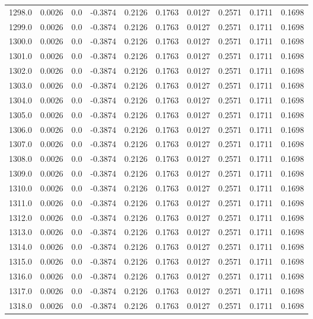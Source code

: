 \begin{longtable}{lrrrrrrrrr}
1298.0 & 0.0026 & 0.0 & -0.3874 & 0.2126 & 0.1763 & 0.0127 & 0.2571 & 0.1711 & 0.1698 \\
1299.0 & 0.0026 & 0.0 & -0.3874 & 0.2126 & 0.1763 & 0.0127 & 0.2571 & 0.1711 & 0.1698 \\
1300.0 & 0.0026 & 0.0 & -0.3874 & 0.2126 & 0.1763 & 0.0127 & 0.2571 & 0.1711 & 0.1698 \\
1301.0 & 0.0026 & 0.0 & -0.3874 & 0.2126 & 0.1763 & 0.0127 & 0.2571 & 0.1711 & 0.1698 \\
1302.0 & 0.0026 & 0.0 & -0.3874 & 0.2126 & 0.1763 & 0.0127 & 0.2571 & 0.1711 & 0.1698 \\
1303.0 & 0.0026 & 0.0 & -0.3874 & 0.2126 & 0.1763 & 0.0127 & 0.2571 & 0.1711 & 0.1698 \\
1304.0 & 0.0026 & 0.0 & -0.3874 & 0.2126 & 0.1763 & 0.0127 & 0.2571 & 0.1711 & 0.1698 \\
1305.0 & 0.0026 & 0.0 & -0.3874 & 0.2126 & 0.1763 & 0.0127 & 0.2571 & 0.1711 & 0.1698 \\
1306.0 & 0.0026 & 0.0 & -0.3874 & 0.2126 & 0.1763 & 0.0127 & 0.2571 & 0.1711 & 0.1698 \\
1307.0 & 0.0026 & 0.0 & -0.3874 & 0.2126 & 0.1763 & 0.0127 & 0.2571 & 0.1711 & 0.1698 \\
1308.0 & 0.0026 & 0.0 & -0.3874 & 0.2126 & 0.1763 & 0.0127 & 0.2571 & 0.1711 & 0.1698 \\
1309.0 & 0.0026 & 0.0 & -0.3874 & 0.2126 & 0.1763 & 0.0127 & 0.2571 & 0.1711 & 0.1698 \\
1310.0 & 0.0026 & 0.0 & -0.3874 & 0.2126 & 0.1763 & 0.0127 & 0.2571 & 0.1711 & 0.1698 \\
1311.0 & 0.0026 & 0.0 & -0.3874 & 0.2126 & 0.1763 & 0.0127 & 0.2571 & 0.1711 & 0.1698 \\
1312.0 & 0.0026 & 0.0 & -0.3874 & 0.2126 & 0.1763 & 0.0127 & 0.2571 & 0.1711 & 0.1698 \\
1313.0 & 0.0026 & 0.0 & -0.3874 & 0.2126 & 0.1763 & 0.0127 & 0.2571 & 0.1711 & 0.1698 \\
1314.0 & 0.0026 & 0.0 & -0.3874 & 0.2126 & 0.1763 & 0.0127 & 0.2571 & 0.1711 & 0.1698 \\
1315.0 & 0.0026 & 0.0 & -0.3874 & 0.2126 & 0.1763 & 0.0127 & 0.2571 & 0.1711 & 0.1698 \\
1316.0 & 0.0026 & 0.0 & -0.3874 & 0.2126 & 0.1763 & 0.0127 & 0.2571 & 0.1711 & 0.1698 \\
1317.0 & 0.0026 & 0.0 & -0.3874 & 0.2126 & 0.1763 & 0.0127 & 0.2571 & 0.1711 & 0.1698 \\
1318.0 & 0.0026 & 0.0 & -0.3874 & 0.2126 & 0.1763 & 0.0127 & 0.2571 & 0.1711 & 0.1698 \\

\end{longtable}
